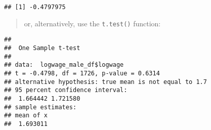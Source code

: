 \documentclass[
]{article}
\newenvironment{Shaded}{\begin{snugshade}}{\end{snugshade}}
\newcommand{\AttributeTok}[1]{\textcolor[rgb]{0.13,0.29,0.53}{#1}}
\newcommand{\FloatTok}[1]{\textcolor[rgb]{0.00,0.00,0.81}{#1}}
\newcommand{\FunctionTok}[1]{\textcolor[rgb]{0.13,0.29,0.53}{\textbf{#1}}}
\newcommand{\NormalTok}[1]{#1}
\newcommand{\OtherTok}[1]{\textcolor[rgb]{0.56,0.35,0.01}{#1}}
\newcommand{\SpecialCharTok}[1]{\textcolor[rgb]{0.81,0.36,0.00}{\textbf{#1}}}
\newcommand{\StringTok}[1]{\textcolor[rgb]{0.31,0.60,0.02}{#1}}
\begin{document}
\begin{Shaded}
\end{Shaded}

\begin{verbatim}
## [1] -0.4797975
\end{verbatim}

\begin{quote}
or, alternatively, use the \texttt{t.test()} function:
\end{quote}

\begin{Shaded}
\end{Shaded}

\begin{verbatim}
## 
##  One Sample t-test
## 
## data:  logwage_male_df$logwage
## t = -0.4798, df = 1726, p-value = 0.6314
## alternative hypothesis: true mean is not equal to 1.7
## 95 percent confidence interval:
##  1.664442 1.721580
## sample estimates:
## mean of x 
##  1.693011
\end{verbatim}
\end{document}
